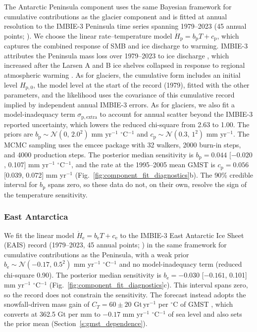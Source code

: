 \documentclass[draft,linenumbers]{agujournal2025}
\begin{document}
The Antarctic Peninsula component uses the same Bayesian framework for cumulative contributions as the glacier component and is fitted at annual resolution to the IMBIE-3 Peninsula time series spanning 1979--2023 (45 annual points; \citealp{Otosaka2026}). We choose the linear rate--temperature model $\dot{H}_{\mathrm{p}} = b_{\mathrm{p}}T + c_{\mathrm{p}}$, which captures the combined response of SMB and ice discharge to warming. IMBIE-3 attributes the Peninsula mass loss over 1979--2023 to ice discharge \citep{Otosaka2026}, which increased after the Larsen A and B ice shelves collapsed in response to regional atmospheric warming \citep{Scambos2004}. As for glaciers, the cumulative form includes an initial level $H_{\mathrm{p},0}$, the model level at the start of the record (1979), fitted with the other parameters, and the likelihood uses the covariance of this cumulative record implied by independent annual IMBIE-3 errors. As for glaciers, we also fit a model-inadequacy term $\sigma_{\mathrm{p,extra}}$ to account for annual scatter beyond the IMBIE-3 reported uncertainty, which lowers the reduced chi-square from 2.63 to 1.00. The priors are $b_{\mathrm{p}}\sim\mathcal{N}(0,\,2.0^2)$ mm yr$^{-1}$ $^\circ$C$^{-1}$ and $c_{\mathrm{p}} \sim \mathcal{N}(0.3,\,1^2)$ mm yr$^{-1}$. The MCMC sampling uses the emcee package with 32 walkers, 2000 burn-in steps, and 4000 production steps. The posterior median sensitivity is $b_{\mathrm{p}} = 0.044$ [$-0.020$, 0.107] mm yr$^{-1}$ $^\circ$C$^{-1}$, and the rate at the 1995--2005 mean GMST is $c_{\mathrm{p}} = 0.056$ [0.039, 0.072] mm yr$^{-1}$ (Fig.~\ref{fig:component_fit_diagnostics}b). The 90\% credible interval for $b_{\mathrm{p}}$ spans zero, so these data do not, on their own, resolve the sign of the temperature sensitivity. 


\subsubsection{East Antarctica}
\label{s:eais}

We fit the linear model $\dot{H}_{\mathrm{e}} = b_{\mathrm{e}}T + c_{\mathrm{e}}$ to the IMBIE-3 East Antarctic Ice Sheet (EAIS) record (1979--2023, 45 annual points; \citealp{Otosaka2026}) in the same framework for cumulative contributions as the Peninsula, with a weak prior $b_{\mathrm{e}} \sim \mathcal{N}(-0.17,\,0.5^2)$ mm yr$^{-1}$ $^\circ$C$^{-1}$ and no model-inadequacy term (reduced chi-square 0.90). The posterior median sensitivity is $b_{\mathrm{e}} = -0.030$ [$-0.161$, 0.101] mm yr$^{-1}$ $^\circ$C$^{-1}$ (Fig.~\ref{fig:component_fit_diagnostics}c). This interval spans zero, so the record does not constrain the sensitivity. The forecast instead adopts the snowfall-driven mass gain of $C_T = 60\pm20$ Gt\,yr$^{-1}$ per $^\circ$C of GMST \citep{Frieler2015,Ligtenberg2013}, which converts at 362.5 Gt per mm to $-0.17$ mm yr$^{-1}$ $^\circ$C$^{-1}$ of sea level and also sets the prior mean (Section~\ref{s:gmst_dependence}). 
\end{document}
